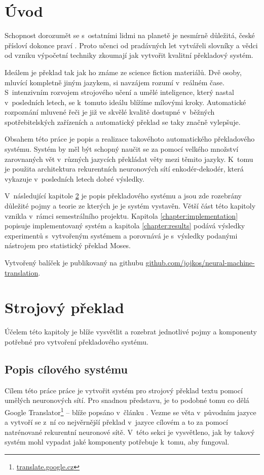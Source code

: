 \chapter{Úvod}
Schopnost dorozumět se s~ostatními lidmi na planetě je nesmírně důležitá, české přísloví dokonce praví . Proto učenci od pradávných let vytvářeli slovníky a vědci od vzniku výpočetní techniky zkoumají jak vytvořit kvalitní překladový systém.

Ideálem je překlad tak jak ho známe ze science fiction materiálů. Dvě osoby, mluvící kompletně jiným jazykem, si navzájem rozumí v~reálném čase. S~intenzivním rozvojem strojového učení a umělé inteligence, který nastal v~posledních letech, se k~tomuto ideálu blížíme mílovými kroky. Automatické rozpoznání mluvené řeči je již ve skvělé kvalitě dostupné v~běžných spotřebitelských zařízeních a automatický překlad se taky značně vylepšuje.

Obsahem této práce je popis a realizace takovéhoto automatického překladového systému. Systém by měl být schopný naučit se za pomocí velkého množství zarovnaných vět v~různých jazycích překládat věty mezi těmito jazyky. K~tomu je použita architektura rekurentních neuronových sítí enkodér-dekodér, která vykazuje v~posledních letech dobré výsledky.

V~následující kapitole \ref{chapter:theory} je popis překladového systému a jsou zde rozebrány důležité pojmy a teorie ze kterých je je systém vystavěn. Větší část této kapitoly vznikla v~rámci semestrálního projektu. Kapitola \ref{chapter:implementation} popisuje implementovaný systém a kapitola \ref{chapter:results} podává výsledky experimentů s~vytvořeným systémem a porovnává je s~výsledky podanými nástrojem pro statistický překlad Moses.

Vytvořený balíček je publikovaný na githubu \url{github.com/jojkos/neural-machine-translation}.


\chapter{Strojový překlad}\label{chapter:theory}
Účelem této kapitoly je blíže vysvětlit a rozebrat jednotlivé pojmy a komponenty potřebné pro vytvoření překladového systému.

\section{Popis cílového systému} \label{chapter:draft}
Cílem této práce práce je vytvořit systém pro strojový překlad textu pomocí umělých neuronových sítí. Pro snadnou představu, je to podobné tomu co dělá Google Translator\footnote{\url{translate.google.cz}} -- blíže popsáno v~článku \cite{googleBridgingGap}. Vezme se věta v~původním jazyce a vytvoří se z~ní co nejvěrnější překlad v~jazyce cílovém a to za pomocí natrénované rekurentní neuronové sítě. V~této sekci je vysvětleno, jak by takový systém mohl vypadat jaké komponenty potřebuje k~tomu, aby fungoval.

